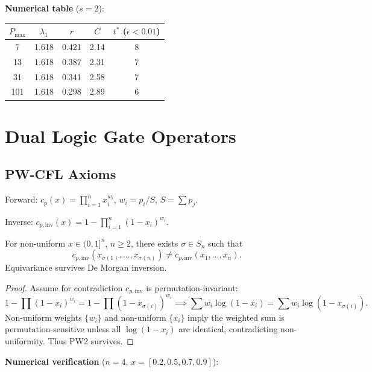\documentclass[11pt]{article}
\begin{document}
\textbf{Numerical table} ($s=2$):

\begin{table}[h]
\centering
\begin{tabular}{@{}ccccc@{}}
\toprule
$P_{\max}$ & $\lambda_1$ & $r$ & $C$ & $t^*$ ($\epsilon<0.01$) \\
\midrule
7   & 1.618 & 0.421 & 2.14 & 8 \\
13  & 1.618 & 0.387 & 2.31 & 7 \\
31  & 1.618 & 0.341 & 2.58 & 7 \\
101 & 1.618 & 0.298 & 2.89 & 6 \\
\bottomrule
\end{tabular}
\end{table}

\section{Dual Logic Gate Operators}

\subsection{PW-CFL Axioms}

\begin{definition}
Forward: $c_p(x) = \prod_{i=1}^n x_i^{w_i}$, $w_i = p_i / S$, $S = \sum p_j$.

Inverse: $c_{p,\text{inv}}(x) = 1 - \prod_{i=1}^n (1-x_i)^{w_i}$.
\end{definition}

\begin{theorem}
\label{thm:pw2_survival}
For non-uniform $x \in (0,1]^n$, $n \ge 2$, there exists $\sigma \in S_n$ such that
\[
c_{p,\text{inv}}(x_{\sigma(1)},\dots,x_{\sigma(n)}) \neq c_{p,\text{inv}}(x_1,\dots,x_n).
\]
Equivariance survives De Morgan inversion.
\end{theorem}

\begin{proof}
Assume for contradiction $c_{p,\text{inv}}$ is permutation-invariant:
\[
1 - \prod (1-x_i)^{w_i} = 1 - \prod (1-x_{\sigma(i)})^{w_i} \implies \sum w_i \log(1-x_i) = \sum w_i \log(1-x_{\sigma(i)}).
\]
Non-uniform weights $\{w_i\}$ and non-uniform $\{x_i\}$ imply the weighted sum is permutation-sensitive unless all $\log(1-x_i)$ are identical, contradicting non-uniformity. Thus PW2 survives.
\end{proof}

\textbf{Numerical verification} ($n=4$, $x=[0.2,0.5,0.7,0.9]$):
\end{document}
